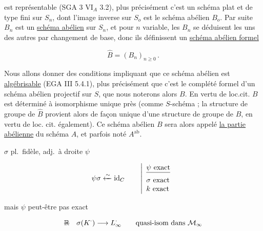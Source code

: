 est représentable (SGA 3 $\mathrm{VI}_A$ 3.2), plus précisément c'est un schéma plat et de type fini sur $S_n$, dont l'image inverse sur $S_o$ est le schéma abélien $B_o$. Par suite $B_n$ est un \uline{schéma abélien} sur $S_n$, et pour $n$ variable, les $B_n$ se déduisent les uns des autres par changement de base, donc ils définissent un \uline{schéma abélien formel}

\[
\hat B=(B_n)_{n\geq0}\,.\tag*{(7.1.2)}
\]

Nous allons donner des conditions impliquant que ce schéma abélien est \uline{algébrisable} (EGA III 5.4.1), plus précisément que c'est le complété formel d'un schéma abélien projectif sur $S$, que nous noterons alors $B$. En vertu de loc.cit. $B$ est déterminé à isomorphisme unique près (comme $S$-schéma ; la structure de groupe de $\hat B$ provient alors de façon unique d'une structure de groupe de $B$, en vertu de loc. cit. également). Ce schéma abélien $B$ sera alors appelé \uline{la partie abélienne} du schéma $A$, et parfois noté $A^{\mathrm{ab}}$.


$\sigma$ pl.\ fidèle, adj.\ à droite $\psi$

\[
\psi\sigma\xleftarrow{\sim}\mathrm{id}_C\qquad
\left|\begin{array}{l}\deleted{\psi\text{ exact}}\\ \sigma\text{ exact}\\ k\text{ exact}\end{array}\right.
\]

mais $\psi$ peut-être pas exact

\[
\deleted{\mathbb R}\quad\sigma(K^\cdot)\longrightarrow L_\infty^\cdot\qquad\text{quasi-isom dans }\mathcal M_\infty
\]


